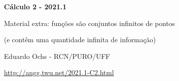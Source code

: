 \documentclass[oneside,12pt]{article}
\begin{document}


\long{}
\long{}
\long{}
\long{}
\long{}
\long{}
\long{}
\long{}
\long{}
\long{}
\long{}

\long{}
\long{}

\def\frown{\ensuremath{{=}{(}}}
\def\True {\mathbf{V}}
\def\False{\mathbf{F}}
\def\D    {\displaystyle}

\def\drafturl{http://angg.twu.net/LATEX/2021-1-C2.pdf}
\def\drafturl{http://angg.twu.net/2021.1-C2.html}
\def\draftfooter{\tiny \href{\drafturl}{\jobname{}} \ColorBrown{\shorttoday{} \hours}}



%

\thispagestyle{empty}

\begin{center}

\vspace*{1.2cm}

{\bf \Large Cálculo 2 - 2021.1}

\bsk

Material extra: funções são conjuntos infinitos de pontos

(e contêm uma quantidade infinita de informação)


\bsk

Eduardo Ochs - RCN/PURO/UFF

\url{http://angg.twu.net/2021.1-C2.html}

\end{center}
\end{document}
